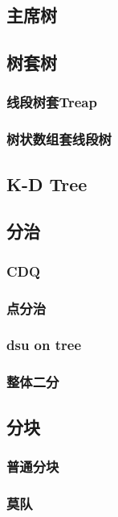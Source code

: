 \documentclass[twocolumn,a4]{article}
\newcommand{\addcpp}[1]{}
\begin{document}
	\subsection{主席树}
		\addcpp{datastruct/perSeg}
	\subsection{树套树}
		\subsubsection{线段树套Treap}
			\addcpp{datastruct/seg_treap}
		\subsubsection{树状数组套线段树}
			\addcpp{datastruct/fenwick_seg}
	\subsection{K-D Tree}
		\addcpp{datastruct/kdtree} 
	\subsection{分治}
		\subsubsection{CDQ}
			\addcpp{datastruct/cdq_strictly}
			\addcpp{datastruct/cdq}
		\subsubsection{点分治}
		\subsubsection{dsu on tree}
			\addcpp{datastruct/dsu_on_tree}
		\subsubsection{整体二分}
	\subsection{分块}
		\subsubsection{普通分块}
			\addcpp{datastruct/block}
		\subsubsection{莫队}
			\addcpp{datastruct/motao}
\end{document}
